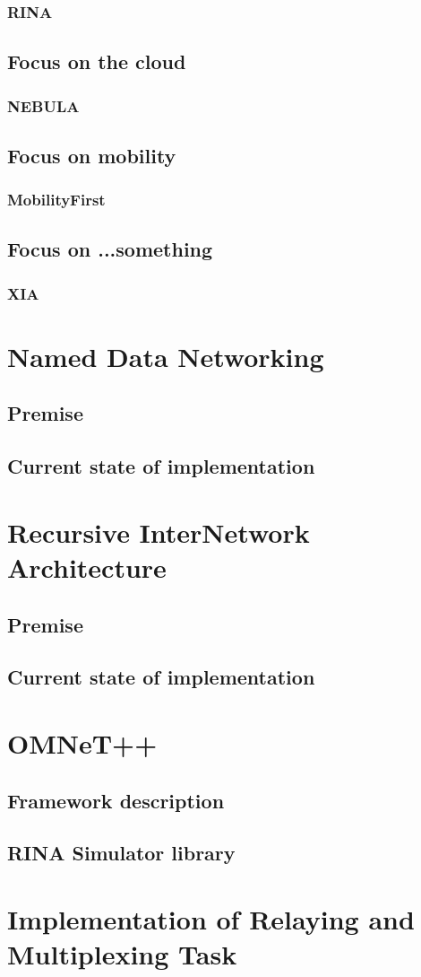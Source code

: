 		\subsection{RINA}
	\section{Focus on the cloud}
		\subsection{NEBULA}
	\section{Focus on mobility}
		\subsection{MobilityFirst}
	\section{Focus on ...something}
		\subsection{XIA}
	

\chapter{Named Data Networking}\label{ndn}
	\section{Premise}
	\section{Current state of implementation}

\chapter{Recursive InterNetwork Architecture}\label{rina}
	\section{Premise}
	\section{Current state of implementation}

\chapter{OMNeT++}\label{omnet}
	\section{Framework description}
	\section{RINA Simulator library}

\chapter{Implementation of Relaying and Multiplexing Task}\label{implementation}




